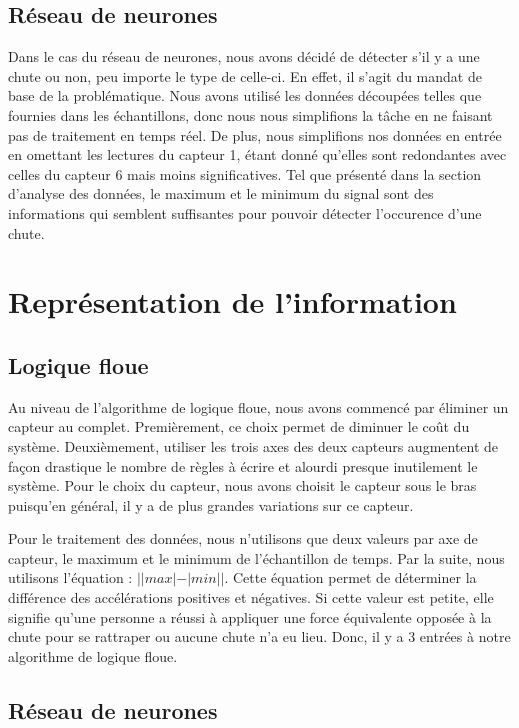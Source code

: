 \documentclass[12pt,letterpaper]{article}
\begin{document}
\subsection{Réseau de neurones} %
Dans le cas du réseau de neurones, nous avons décidé de détecter s'il y a une chute ou non, peu importe le type de celle-ci. En effet, il s'agit du mandat de base de la problématique. Nous avons utilisé les données découpées telles que fournies dans les échantillons, donc nous nous simplifions la tâche en ne faisant pas de traitement en temps réel. De plus, nous simplifions nos données en entrée en omettant les lectures du capteur 1, étant donné qu'elles sont redondantes avec celles du capteur 6 mais moins significatives. Tel que présenté dans la section d'analyse des données, le maximum et le minimum du signal sont des informations qui semblent suffisantes pour pouvoir détecter l'occurence d'une chute.

\section{Représentation de l'information}

\subsection{Logique floue}

Au niveau de l'algorithme de logique floue, nous avons commencé par éliminer un capteur au complet. Premièrement, ce choix permet de diminuer le coût du système. Deuxièmement, utiliser les trois axes des deux capteurs augmentent de façon drastique le nombre de règles à écrire et alourdi presque inutilement le système. Pour le choix du capteur, nous avons choisit le capteur sous le bras puisqu'en général, il y a de plus grandes variations sur ce capteur.

Pour le traitement des données, nous n'utilisons que deux valeurs par axe de capteur, le maximum et le minimum de l'échantillon de temps. Par la suite, nous utilisons l'équation : $||max|-|min||$. Cette équation permet de déterminer la différence des accélérations positives et négatives. Si cette valeur est petite, elle signifie qu'une personne a réussi à appliquer une force équivalente opposée à la chute pour se rattraper ou aucune chute n'a eu lieu. Donc, il y a 3 entrées à notre algorithme de logique floue.

\subsection{Réseau de neurones} %
\end{document}
